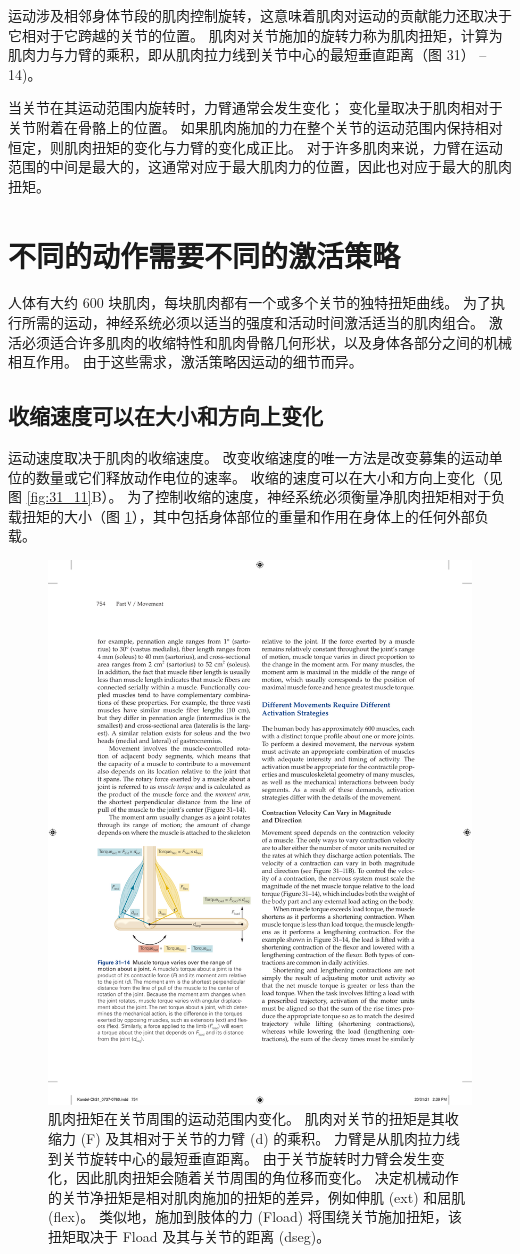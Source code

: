 运动涉及相邻身体节段的肌肉控制旋转，这意味着肌肉对运动的贡献能力还取决于它相对于它跨越的关节的位置。 肌肉对关节施加的旋转力称为肌肉扭矩，计算为肌肉力与力臂的乘积，即从肌肉拉力线到关节中心的最短垂直距离（图 31） –14)。

当关节在其运动范围内旋转时，力臂通常会发生变化； 变化量取决于肌肉相对于关节附着在骨骼上的位置。 如果肌肉施加的力在整个关节的运动范围内保持相对恒定，则肌肉扭矩的变化与力臂的变化成正比。 对于许多肌肉来说，力臂在运动范围的中间是最大的，这通常对应于最大肌肉力的位置，因此也对应于最大的肌肉扭矩。


\section{不同的动作需要不同的激活策略}
人体有大约 600 块肌肉，每块肌肉都有一个或多个关节的独特扭矩曲线。 为了执行所需的运动，神经系统必须以适当的强度和活动时间激活适当的肌肉组合。 激活必须适合许多肌肉的收缩特性和肌肉骨骼几何形状，以及身体各部分之间的机械相互作用。 由于这些需求，激活策略因运动的细节而异。

\subsection{收缩速度可以在大小和方向上变化}
运动速度取决于肌肉的收缩速度。 改变收缩速度的唯一方法是改变募集的运动单位的数量或它们释放动作电位的速率。 收缩的速度可以在大小和方向上变化（见图 \ref{fig:31_11}B）。 
为了控制收缩的速度，神经系统必须衡量净肌肉扭矩相对于负载扭矩的大小（图 \ref{fig:31_14}），其中包括身体部位的重量和作用在身体上的任何外部负载。

\begin{figure}[htbp]
	\centering
	\includegraphics[width=0.5\linewidth]{chap31/fig_31_14}
	\caption{肌肉扭矩在关节周围的运动范围内变化。 肌肉对关节的扭矩是其收缩力 (F) 及其相对于关节的力臂 (d) 的乘积。 力臂是从肌肉拉力线到关节旋转中心的最短垂直距离。 由于关节旋转时力臂会发生变化，因此肌肉扭矩会随着关节周围的角位移而变化。 决定机械动作的关节净扭矩是相对肌肉施加的扭矩的差异，例如伸肌 (ext) 和屈肌 (flex)。 类似地，施加到肢体的力 (Fload) 将围绕关节施加扭矩，该扭矩取决于 Fload 及其与关节的距离 (dseg)。}
	\label{fig:31_14}
\end{figure}

